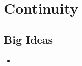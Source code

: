 \chapter{Continuity}
\label{chap:C}

\section{Big Ideas}
\label{sec:C Big Ideas}
\begin{itemize}
  \item 
\end{itemize}